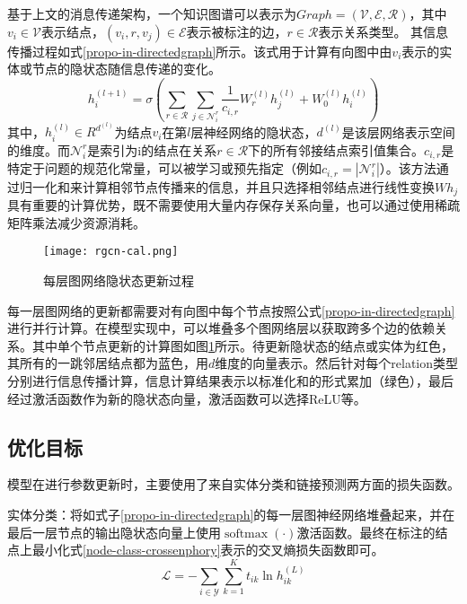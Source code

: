 基于上文的消息传递架构，一个知识图谱可以表示为$Graph=\left(\mathcal{V},\mathcal{E},\mathcal{R}\right)$，其中$v_i\in\mathcal{V}$表示结点，$\left(v_i,r,v_j\right)\in\mathcal{E}$表示被标注的边，$r\in\mathcal{R}$表示关系类型。
其信息传播过程如式\ref{propo-in-directedgraph}所示。该式用于计算有向图中由$v_{i}$表示的实体或节点的隐状态随信息传递的变化。
\begin{equation}
    h_{i}^{(l+1)}=\sigma\left(\sum_{r \in \mathcal{R}} \sum_{j \in \mathcal{N}_{i}^{r}} \frac{1}{c_{i, r}} W_{r}^{(l)} h_{j}^{(l)}+W_{0}^{(l)} h_{i}^{(l)}\right)
    \label{propo-in-directedgraph}
\end{equation}
其中，$h_i^{\left(l\right)}\in R^{d^{\left(l\right)}}$为结点$v_i$在第$l$层神经网络的隐状态，$d^{\left(l\right)}$是该层网络表示空间的维度。而$\mathcal{N}_{i}^{r}$是索引为i的结点在关系$r\in\mathcal{R}$下的所有邻接结点索引值集合。$c_{i,r}$是特定于问题的规范化常量，可以被学习或预先指定（例如$c_{i, r}=\left|\mathcal{N}_{i}^{r}\right|$）。该方法通过归一化和来计算相邻节点传播来的信息，并且只选择相邻结点进行线性变换$Wh_j$具有重要的计算优势，既不需要使用大量内存保存关系向量，也可以通过使用稀疏矩阵乘法减少资源消耗。

\begin{figure}[htbp]
    \centering
    \texttt{[image: rgcn-cal.png]}
    \caption{每层图网络隐状态更新过程\label{rgcn-cal}}
\end{figure}

每一层图网络的更新都需要对有向图中每个节点按照公式\ref{propo-in-directedgraph}进行并行计算。在模型实现中，可以堆叠多个图网络层以获取跨多个边的依赖关系。其中单个节点更新的计算图如图\ref{rgcn-cal}所示。待更新隐状态的结点或实体为红色，其所有的一跳邻居结点都为蓝色，用$d$维度的向量表示。然后针对每个relation类型分别进行信息传播计算，信息计算结果表示以标准化和的形式累加（绿色），最后经过激活函数作为新的隐状态向量，激活函数可以选择ReLU等。

\subsection{优化目标}
模型在进行参数更新时，主要使用了来自实体分类和链接预测两方面的损失函数。

实体分类：将如式子\ref{propo-in-directedgraph}的每一层图神经网络堆叠起来，并在最后一层节点的输出隐状态向量上使用$\operatorname{softmax}(\cdot)$激活函数。最终在标注的结点上最小化式\ref{node-class-crossenphory}表示的交叉熵损失函数即可。
\begin{equation}
    \mathcal{L}=-\sum_{i \in \mathcal{Y}} \sum_{k=1}^{K} t_{i k} \ln h_{i k}^{(L)}
    \label{node-class-crossenphory}
\end{equation}

